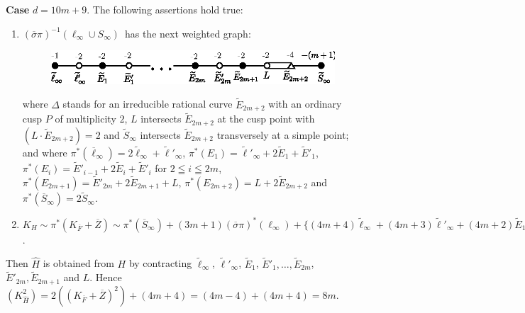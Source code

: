 \subsubsection{}\label{chap3:3.6.8}
{\bf Case} $d=10m+9$. The following assertions hold true: 
\begin{enumerate}
\renewcommand{\labelenumi}{(\theenumi)}
\item $(\overline{\sigma}\pi)^{-1}(\ell_{\infty}\cup
  S_{\infty})$\pageoriginale\ has the next weighted graph:
\begin{figure}[H]
\centering
\includegraphics{figures/miyansi_fig51.eps}
\end{figure}
\noindent
where $\Delta$ stands for an irreducible rational curve
$\widetilde{E}_{2m+2}$ with an ordinary cusp $P$ of multiplicity $2$,
$L$ intersects $\widetilde{E}_{2m+2}$ at the cusp point with
$(L\cdot\widetilde{E}_{2m+2})=2$ and $\widetilde{S}_{\infty}$
intersects $\widetilde{E}_{2m+2}$ transversely at a simple point; and
where
$\pi^{\ast}(\overline{\ell}_{\infty})=2\widetilde{\ell}_{\infty}+\widetilde{\ell}'_{\infty}$,
$\pi^{\ast}(E_{1})=\widetilde{\ell}'_{\infty}+2\widetilde{E}_{1}+\widetilde{E}'_{1}$,
$\pi^{\ast}(E_{i})=\widetilde{E}'_{i-1}+2\widetilde{E}_{i}+\widetilde{E}'_{i}$
for $2\leqq i\leqq 2m$,
$\pi^{\ast}(E_{2m+1})=\widetilde{E}'_{2m}+2\widetilde{E}_{2m+1}+L$,
$\pi^{\ast}(E_{2m+2})=L+2\widetilde{E}_{2m+2}$ and
$\pi^{\ast}(\overline{S}_{\infty})=2\widetilde{S}_{\infty}$.

\item $K_{H}\sim
  \pi^{\ast}(K_{\overline{F}}+\overline{Z})\sim\pi^{\ast}(\overline{S}_{\infty})+(3m+1)(\overline{\sigma}\pi)^{\ast}(\ell_{\infty})+\{(4m+4)\widetilde{\ell}_{\infty}+(4m+3)\widetilde{\ell}'_{\infty}+(4m+2)\widetilde{E}_{1}+\cdots+4\widetilde{E}_{2m}+3\widetilde{E}'_{2m}+2\widetilde{E}_{2m+1}+L\}$.  
\end{enumerate}

Then $\widehat{H}$ is obtained from $H$ by contracting
$\widetilde{\ell}_{\infty}$, $\widetilde{\ell}'_{\infty}$,
$\widetilde{E}_{1}$,
$\widetilde{E}'_{1},\ldots,\widetilde{E}_{2m}$, $\widetilde{E}'_{2m},\widetilde{E}_{2m+1}$
and $L$. Hence
$(K^{2}_{\widehat{H}})=2((K_{\overline{F}}+\overline{Z})^{2})+(4m+4)=(4m-4)+(4m+4)=8m$. 

